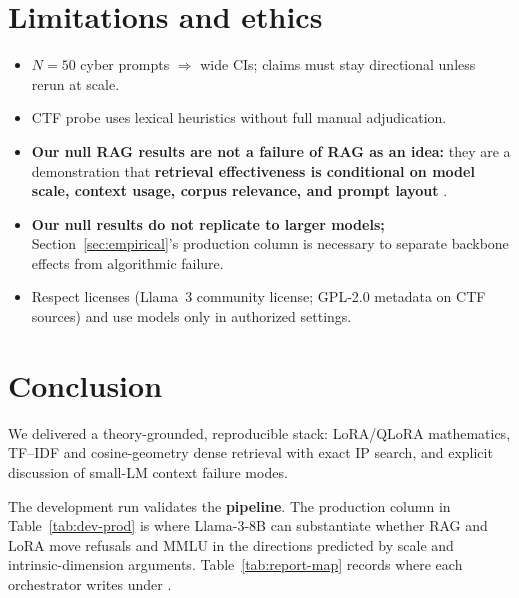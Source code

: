 \documentclass[11pt,a4paper]{article}
\begin{document}
\section[Limitations]{Limitations and ethics}
\label{sec:limitations}

\begin{itemize}[leftmargin=1.4em]
  \item $N{=}50$ cyber prompts $\Rightarrow$ wide CIs; claims must stay directional unless rerun at scale.
  \item CTF probe uses lexical heuristics without full manual adjudication.
  \item \textbf{Our null RAG results are not a failure of RAG as an idea:} they are a demonstration that \textbf{retrieval effectiveness is conditional on model scale, context usage, corpus relevance, and prompt layout} \cite{liu2023lost,lewis2020rag}.
  \item \textbf{Our null results do not replicate to larger models;} Section~\ref{sec:empirical}'s production column is necessary to separate backbone effects from algorithmic failure.
  \item Respect licenses (Llama~3 community license; GPL-2.0 metadata on CTF sources) and use models only in authorized settings.
\end{itemize}

\section{Conclusion}

\begin{sloppypar}
We delivered a theory-grounded, reproducible stack: LoRA/QLoRA mathematics, TF--IDF and cosine-geometry dense retrieval with exact IP search, and explicit discussion of small-LM context failure modes.

The development run validates the \textbf{pipeline}.
The production column in Table~\ref{tab:dev-prod} is where Llama-3-8B can substantiate whether RAG and LoRA move refusals and MMLU in the directions predicted by scale and intrinsic-dimension arguments.
Table~\ref{tab:report-map} records where each orchestrator writes under .
\end{sloppypar}
\end{document}
